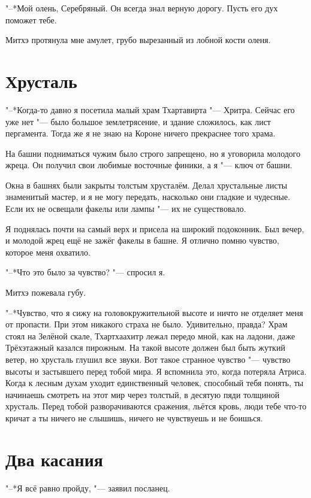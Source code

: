 \documentclass[a4paper,10pt,fleqn]{book}
\newcommand{\ldotst}{\so{...}\xspace}
\begin{document}
"--*Мой олень, Серебряный.
Он всегда знал верную дорогу.
Пусть его дух поможет тебе.

Митхэ протянула мне амулет, грубо вырезанный из лобной кости оленя.

\section{Хрусталь}

"--*Когда-то давно я посетила малый храм Тхартавирта "--- Хритра.
Сейчас его уже нет "--- было большое землетрясение, и здание сложилось, как лист пергамента.
Тогда же\ldotst я не знаю на Короне ничего прекраснее того храма.

На башни подниматься чужим было строго запрещено, но я уговорила молодого жреца.
Он получил свои любимые восточные финики, а я "--- ключ от башни.

Окна в башнях были закрыты толстым хрусталём.
Делал хрустальные листы знаменитый мастер, и я не могу передать, насколько они гладкие и чудесные.
Если их не освещали факелы или лампы "--- их не существовало.

Я поднялась почти на самый верх и присела на широкий подоконник.
Был вечер, и молодой жрец ещё не зажёг факелы в башне.
Я отлично помню чувство, которое меня охватило.

"--*Что это было за чувство? "--- спросил я.

Митхэ пожевала губу.

"--*Чувство, что я сижу на головокружительной высоте и ничто не отделяет меня от пропасти.
При этом никакого страха не было.
Удивительно, правда?
Храм стоял на Зелёной скале, Тхартхаахитр лежал передо мной, как на ладони, даже Трёхэтажный казался пирожным.
На такой высоте должен был быть жуткий ветер, но хрусталь глушил все звуки.
Вот такое странное чувство "--- чувство высоты и застывшего перед тобой мира.
Я вспомнила это, когда потеряла Атриса.
Когда к лесным духам уходит единственный человек, способный тебя понять, ты начинаешь смотреть на этот мир через толстый, в десятую пяди толщиной хрусталь.
Перед тобой разворачиваются сражения, льётся кровь, люди тебе что-то кричат\ldotst а ты ничего не слышишь, ничего не чувствуешь и не боишься.

\section{Два касания}

"--*Я всё равно пройду, "--- заявил посланец.
\end{document}
